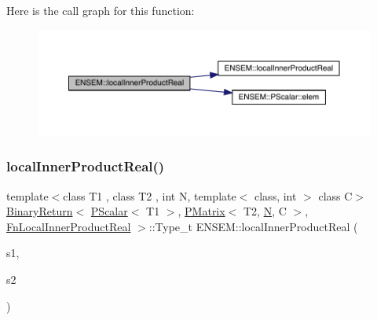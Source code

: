Here is the call graph for this function\+:\nopagebreak
\begin{figure}[H]
\begin{center}
\leavevmode
\includegraphics[width=350pt]{df/d0a/group__primmatrix_ga9db3f5557c105ded2a1e426229646f23_cgraph}
\end{center}
\end{figure}
\mbox{\label{group__primmatrix_ga8a2b85a888121b8b0ff46870c7705474}} 
\subsubsection{\texorpdfstring{localInnerProductReal()}{localInnerProductReal()}\hspace{0.1cm}{\footnotesize\ttfamily [3/3]}}
{\footnotesize\ttfamily template$<$class T1 , class T2 , int N, template$<$ class, int $>$ class C$>$ \\
\mbox{\hyperlink{structENSEM_1_1BinaryReturn}{Binary\+Return}}$<$ \mbox{\hyperlink{classENSEM_1_1PScalar}{P\+Scalar}}$<$ T1 $>$, \mbox{\hyperlink{classENSEM_1_1PMatrix}{P\+Matrix}}$<$ T2, \mbox{\hyperlink{operator__name__util_8cc_a7722c8ecbb62d99aee7ce68b1752f337}{N}}, C $>$, \mbox{\hyperlink{structENSEM_1_1FnLocalInnerProductReal}{Fn\+Local\+Inner\+Product\+Real}} $>$\+::Type\+\_\+t E\+N\+S\+E\+M\+::local\+Inner\+Product\+Real (\begin{DoxyParamCaption}\item[{const \mbox{\hyperlink{classENSEM_1_1PScalar}{P\+Scalar}}$<$ T1 $>$ \&}]{s1,  }\item[{const \mbox{\hyperlink{classENSEM_1_1PMatrix}{P\+Matrix}}$<$ T2, \mbox{\hyperlink{operator__name__util_8cc_a7722c8ecbb62d99aee7ce68b1752f337}{N}}, C $>$ \&}]{s2 }\end{DoxyParamCaption})\hspace{0.3cm}{\ttfamily [inline]}}

